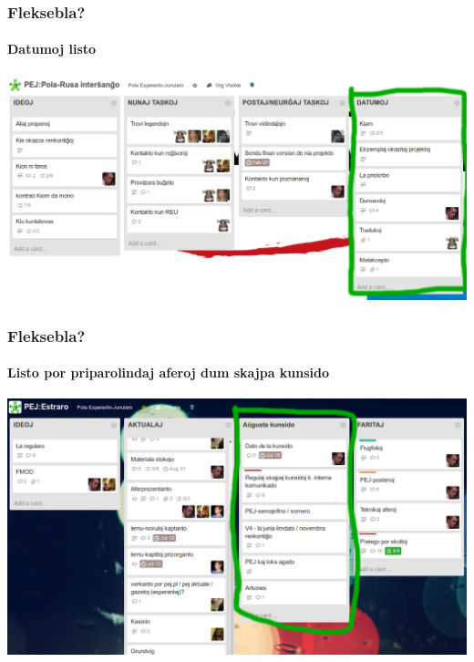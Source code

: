   \begin{frame}
    \frametitle{Fleksebla?}
    \framesubtitle{Datumoj listo}
    
    
    \includegraphics[scale=0.25]{ekranoj/datumoj}

  \end{frame}


  \begin{frame}
    \frametitle{Fleksebla?}
    \framesubtitle{Listo por priparolindaj aferoj dum skajpa kunsido}
    
    \includegraphics[scale=0.25]{ekranoj/augusta-kunsido}

  \end{frame}


